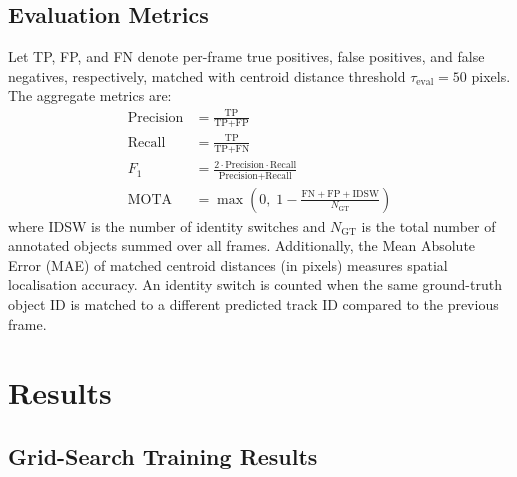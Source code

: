 \documentclass[10pt, conference, compsocconf]{IEEEtran}
\begin{document}
\subsection{Evaluation Metrics}
Let TP, FP, and FN denote per-frame true positives, false positives,
and false negatives, respectively, matched with centroid distance
threshold $\tau_\text{eval} = 50$ pixels. The aggregate metrics are:
\begin{align}
  \text{Precision} &= \frac{\text{TP}}{\text{TP}+\text{FP}} \\[4pt]
  \text{Recall}    &= \frac{\text{TP}}{\text{TP}+\text{FN}} \\[4pt]
  F_1              &= \frac{2 \cdot \text{Precision} \cdot \text{Recall}}
                          {\text{Precision}+\text{Recall}}
  \label{eq:f1} \\[4pt]
  \text{MOTA}      &= \max\!\left(0,\;
                     1 - \frac{\text{FN}+\text{FP}+\text{IDSW}}
                              {N_\text{GT}}\right)
  \label{eq:mota2}
\end{align}
where IDSW is the number of identity switches and $N_\text{GT}$ is
the total number of annotated objects summed over all frames.
Additionally, the Mean Absolute Error (MAE) of matched centroid
distances (in pixels) measures spatial localisation accuracy.
An identity switch is counted when the same ground-truth object ID
is matched to a different predicted track ID compared to the
previous frame.

\section{Results}

\subsection{Grid-Search Training Results}
\end{document}
